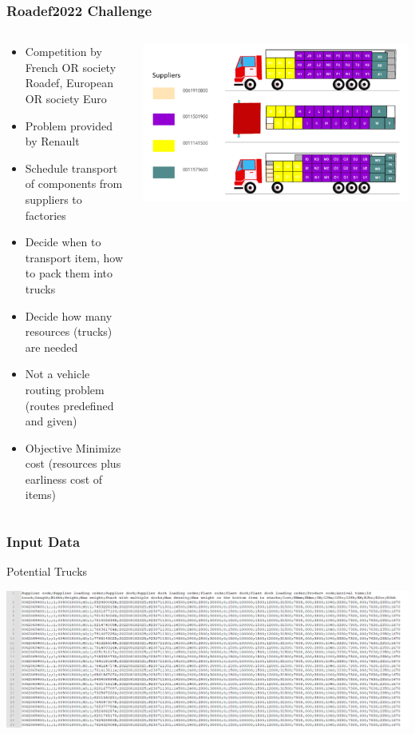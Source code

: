 \documentclass[dvipsnames,aspectratio=169]{beamer}
\begin{document}
\begin{frame}
\frametitle{Roadef2022 Challenge}
\begin{columns}
\begin{column}{0.5\textwidth}
\begin{itemize}
\item Competition by French OR society Roadef, European OR society Euro 
\item Problem provided by Renault
\item Schedule transport of components from suppliers to factories
\item Decide when to transport item, how to pack them into trucks
\item Decide how many resources (trucks) are needed
\item Not a vehicle routing problem (routes predefined and given)
\item Objective Minimize cost (resources plus earliness cost of items)
\end{itemize}
\end{column}
\begin{column}{0.5\textwidth}
\includegraphics[width=\textwidth]{images/roadefsuppliers}
\end{column}
\end{columns}
\end{frame}

\begin{frame}
\frametitle{Input Data}
Potential Trucks

\includegraphics[width=\textwidth]{images/roadeftrucks}

\end{frame}
\end{document}
